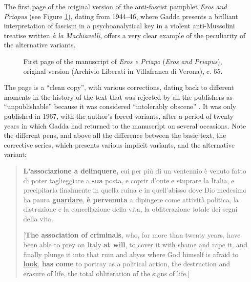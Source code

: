 \begin{paper}
The first page of the original version of the anti-fascist
pamphlet \emph{Eros and Priapus} (see Figure \ref{fig:italia1}), dating from 1944--46, where Gadda presents a
brilliant interpretation of fascism in a psychoanalytical key in a
violent anti-Mussolini treatise written \emph{à la Machiavelli}, offers a
very clear example of the peculiarity of the alternative variants.

\begin{figure}[H]
    \centering
    \caption{First page of the manuscript of \emph{Eros e Priapo} (\emph{Eros
and Priapus}), original version (Archivio Liberati in Villafranca di
Verona), c. 65.}
    \label{fig:italia1}
\end{figure}


The page is a ``clean copy'', with various corrections, dating back to
different moments in the history of the text that was rejected by all the publishers as ``unpublishable'' because it was considered ``intolerably obscene'' \parencite[46, letter from 28 October 1946]{gadda_lettere_1988}. It was only published in 1967, with the author's forced variants, after a period of twenty years in which Gadda had returned to the manuscript on several occasions. Note the different pens, and above all the difference
between the basic text, the corrective series, which presents various
implicit variants, and the alternative variant:

\begin{quote}
\textbf{L'associazione a delinquere,} cui per più di un ventennio è
venuto fatto di poter taglieggiare a \textbf{sua} posta, e coprir d'onte
e stuprare la Italia, e precipitarla finalmente in quella ruina e in
quell'abisso dove Dio medesimo ha paura \textbf{\uline{guardare}},
\textbf{è pervenuta} a dipingere come attività politica, la distruzione
e la cancellazione della vita, la obliterazione totale dei segni della
vita.

\vspace{1em}

[\textbf{The association of criminals}, who, for more than twenty years,
have been able to prey on Italy \textbf{at will}, to cover it with shame
and rape it, and finally plunge it into that ruin and abyss where God
himself is afraid to \textbf{\uline{look}}, \textbf{has come} to portray as a
political action, the destruction and erasure of life, the total
obliteration of the signs of life.]
\begin{flushright}
\parencite[11]{gadda_eros_2016}
\end{flushright}
\end{quote}


\end{paper}
